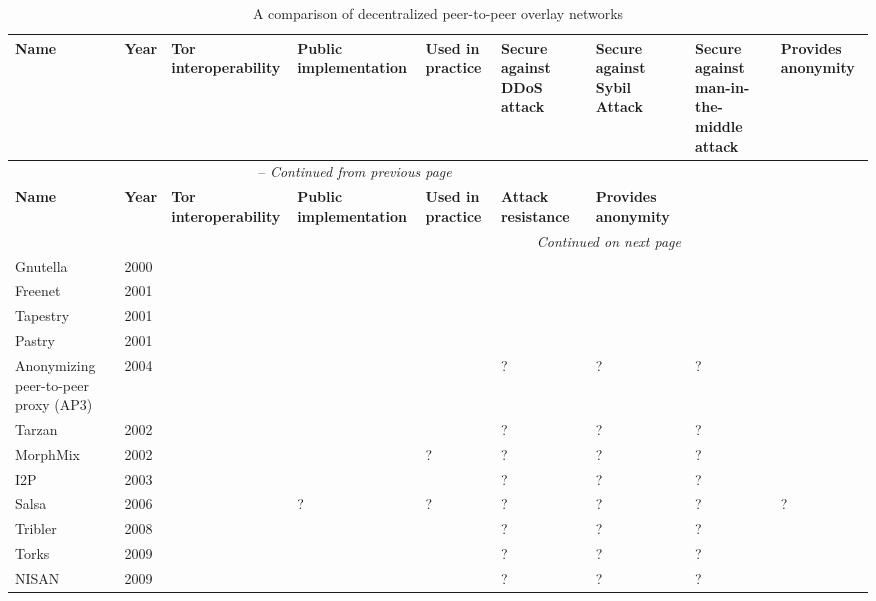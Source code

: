 \begin{center}
    \begin{longtable}{ | p{1.9cm} | p{0.8cm} | p{1.6cm} | p{2.2cm} | p{2.2cm} | p{2.5cm} | p{2.5cm} | p{2.5cm} | p{2cm} | }
  		\caption{A comparison of decentralized peer-to-peer overlay networks} \\ \hline
	    \textbf{Name} & \textbf{Year} & \textbf{Tor interoperability} & \textbf{Public implementation} & \textbf{Used in practice} & \textbf{Secure against DDoS attack} & \textbf{Secure against Sybil Attack} & \textbf{Secure against man-in-the-middle attack} & \textbf{Provides anonymity} \\ \hline
		\endfirsthead
		\multicolumn{7}{c}{\tablename\ \thetable\ -- \textit{Continued from previous page}} \\ \hline
	    \textbf{Name} & \textbf{Year} & \textbf{Tor interoperability} & \textbf{Public implementation} & \textbf{Used in practice} & \textbf{Attack resistance} & \textbf{Provides anonymity} \\ \hline
		\endhead
		\hline \multicolumn{7}{r}{\textit{Continued on next page}} \\
		\endfoot
		\hline
		\endlastfoot
	    
		Gnutella & 2000 & \xmark & \checkmark & \checkmark & \xmark & \xmark & \xmark & \xmark \\ \hline
		Freenet & 2001 & \xmark & \checkmark & \checkmark & \checkmark & \xmark & \xmark & \checkmark \\ \hline
		Tapestry & 2001 & \xmark & \checkmark & \checkmark & \checkmark & \xmark & \xmark & \xmark \\ \hline
		Pastry & 2001 & \xmark & \checkmark & \checkmark & \checkmark & \xmark & \xmark & \xmark \\ \hline
		Anonymizing peer-to-peer proxy (AP3) & 2004 & \xmark & \xmark & \xmark & ? & ? & ? & \checkmark \\ \hline
		Tarzan & 2002 & \xmark & \xmark & \xmark & ? & ? & ? & \checkmark \\ \hline
		MorphMix & 2002 & \xmark & \checkmark & ? & ? & ? & ? & \checkmark \\ \hline
		I2P & 2003 & \xmark & \checkmark & \checkmark & ? & ? & ? & \checkmark\\ \hline
		Salsa & 2006 & \xmark & ? & ? & ? & ? & ? & ?\\ \hline
		Tribler & 2008 & \xmark & \checkmark & \checkmark & ? & ? & ? & \xmark \\ \hline
		Torks & 2009 & \checkmark & \xmark & \xmark & ? & ? & ? & \checkmark \\ \hline
		NISAN & 2009 & \xmark & \xmark & \xmark & ? & ? & ? & \checkmark \\ \hline
    \end{longtable}
\end{center}